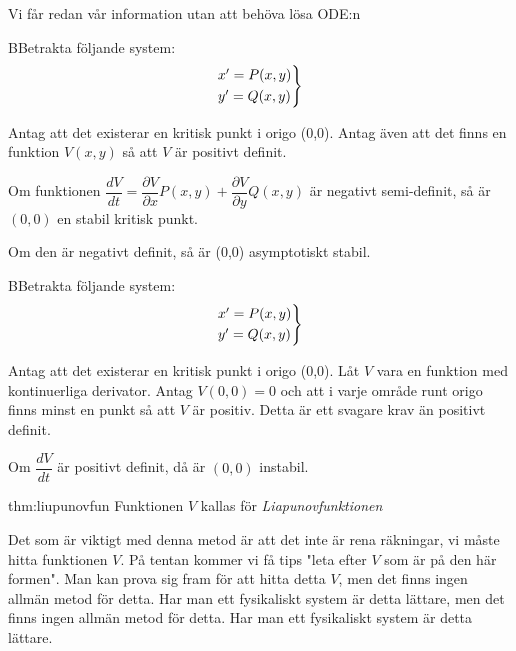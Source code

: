 \par\bigskip
\noindent Vi får redan vår information utan att behöva lösa ODE:n
\par\bigskip
\begin{theo}
  BBetrakta följande system:
  \begin{equation*}
    \begin{gathered}
      \begin{rcases*}
        x^{\prime} = P(x,y)\\
        y^{\prime} = Q(x,y)
      \end{rcases*}
    \end{gathered}
  \end{equation*}\par
  \noindent Antag att det existerar en kritisk punkt i origo (0,0). Antag även att det finns en funktion $V(x,y)$ så att $V$ är positivt definit.\par\bigskip
  \noindent Om funktionen $\dfrac{dV}{dt} = \dfrac{\partial V}{\partial x}P(x,y)+\dfrac{\partial V}{\partial y}Q(x,y)$ är negativt semi-definit, så är $(0,0)$ en stabil kritisk punkt.\par\bigskip
  \noindent Om den är negativt definit, så är (0,0) asymptotiskt stabil.
\end{theo}
\par\bigskip

\begin{theo}
  BBetrakta följande system:
  \begin{equation*}
    \begin{gathered}
      \begin{rcases*}
        x^{\prime} = P(x,y)\\
        y^{\prime} = Q(x,y)
      \end{rcases*}
    \end{gathered}
  \end{equation*}\par
  \noindent Antag att det existerar en kritisk punkt i origo (0,0). Låt $V$ vara en funktion med kontinuerliga derivator. Antag $V(0,0)=0$ och att i varje område runt origo finns minst en punkt så att $V$ är positiv. Detta är ett svagare krav än positivt definit.
  \par\bigskip
  \noindent Om $\dfrac{dV}{dt}$ är positivt definit, då är $(0,0)$ instabil.
\end{theo}
\par\bigskip
\begin{theo}{thm:liupunovfun}
  Funktionen $V$ kallas för \textit{Liapunovfunktionen}
\end{theo}
\par\bigskip
\noindent Det som är viktigt med denna metod är att det inte är rena räkningar, vi måste hitta funktionen $V$. På tentan kommer vi få tips "leta efter $V$ som är på den här formen". Man kan prova sig fram för att hitta detta $V$, men det finns ingen allmän metod för detta. Har man ett fysikaliskt system är detta lättare, men det finns ingen allmän metod för detta. Har man ett fysikaliskt system är detta lättare.
